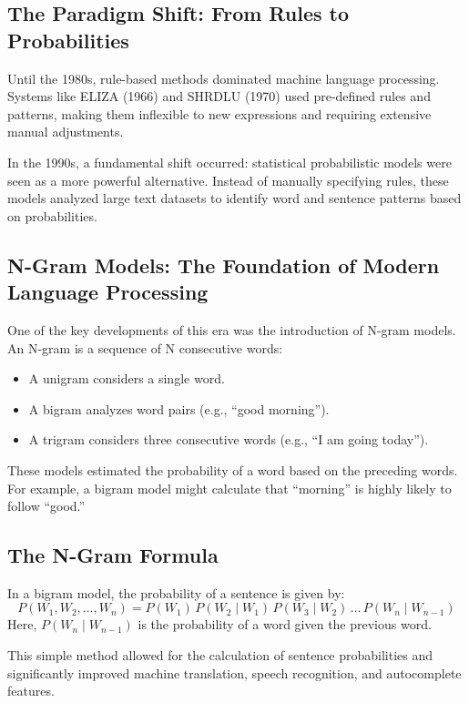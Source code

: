 \subsection{The Paradigm Shift: From Rules to Probabilities}

Until the 1980s, rule-based methods dominated machine language processing. Systems like
ELIZA (1966) and SHRDLU (1970) used pre-defined rules and patterns, making them inflexible
to new expressions and requiring extensive manual adjustments.

In the 1990s, a fundamental shift occurred: statistical probabilistic models were seen as a
more powerful alternative. Instead of manually specifying rules, these models analyzed
large text datasets to identify word and sentence patterns based on probabilities.

\subsection{N-Gram Models: The Foundation of Modern Language Processing}

One of the key developments of this era was the introduction of N-gram models.
An N-gram is a sequence of N consecutive words:
\begin{itemize}
  \item A unigram considers a single word.
  \item A bigram analyzes word pairs (e.g., “good morning”).
  \item A trigram considers three consecutive words (e.g., “I am going today”).
\end{itemize}
These models estimated the probability of a word based on the preceding words. For example,
a bigram model might calculate that “morning” is highly likely to follow “good.”

\subsection{The N-Gram Formula}

In a bigram model, the probability of a sentence is given by:
\[
P(W_1, W_2, \dots, W_n) = P(W_1)\,P(W_2\mid W_1)\,P(W_3\mid W_2)\,
\dots\,P(W_n\mid W_{n-1})
\]
Here, \(P(W_n\mid W_{n-1})\) is the probability of a word given the previous word.

This simple method allowed for the calculation of sentence probabilities and
significantly improved machine translation, speech recognition, and autocomplete features.

